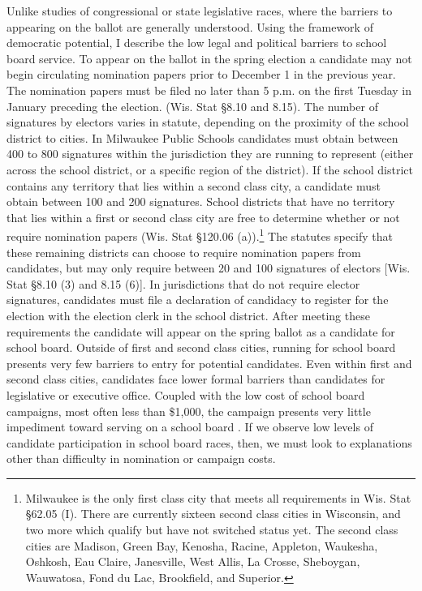 Unlike studies of congressional or state legislative races, where the barriers to 
appearing on the ballot are generally understood. Using the framework of democratic 
potential, I describe the low legal and political barriers to school board service. 
To appear on the ballot in the spring election a candidate may not begin 
circulating nomination papers prior to December 1 in the previous year. The 
nomination papers must be 
filed no later than 5 p.m. on the first Tuesday in January preceding the election. 
(Wis. Stat \S 8.10 and 8.15). The number of signatures by electors varies in statute, 
depending on the proximity of the school district to cities. In Milwaukee Public Schools 
candidates must obtain between 400 to 800 signatures within the jurisdiction they 
are running to represent (either across the school district, or a specific region 
of the district). 
If the school district contains any territory that lies within a second class city, a 
candidate must obtain between 100 and 200 signatures. School districts that have no 
territory that lies within a first or second class city are free to determine 
whether or not require nomination papers (Wis. Stat \S 120.06 (a)).\footnote{Milwaukee 
is the only first class city that meets all requirements in Wis. Stat \S 62.05 (I). 
There are currently sixteen second class cities in Wisconsin, and two more which 
qualify but have not switched status yet. The second class cities are Madison, 
Green Bay, Kenosha, Racine, Appleton, Waukesha, Oshkosh, Eau Claire, Janesville, 
West Allis, La Crosse, Sheboygan, Wauwatosa, Fond du Lac, Brookfield, and Superior.} 
The statutes specify that these remaining districts can choose to require 
nomination papers from candidates, but may only require 
between 20 and 100 signatures of electors [Wis. Stat \S 8.10 (3) and 8.15 (6)]. In 
jurisdictions that do not require elector signatures, candidates must file a declaration 
of candidacy to register for the election with the election clerk in the school district.
After meeting these requirements the candidate will appear on the spring ballot as 
a candidate for school board. Outside of first and second class cities, running for school board presents very few barriers to entry for potential candidates. Even 
within first and second class cities, candidates face lower formal barriers than 
candidates for legislative or executive office. Coupled with the low cost of school board campaigns, most often less than \$1,000, the campaign presents 
very little impediment toward serving on a school board \citep{RefWorks:322}. If we 
observe low levels of candidate participation in school board races, then, we must 
look to explanations other than difficulty in nomination or campaign costs. 

